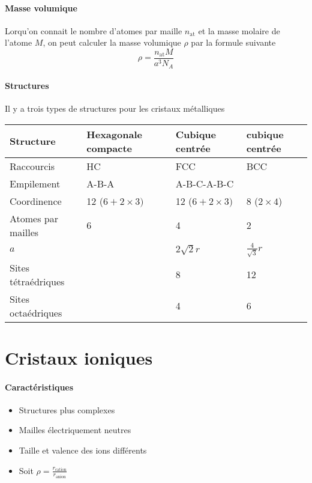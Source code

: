 \paragraph{Masse volumique}
Lorqu'on connait le nombre d'atomes par maille $n_{\mathrm{at}}$ et la masse molaire de l'atome $M$,
on peut calculer la masse volumique $\rho$ par la formule suivante
\[ \rho = \frac{n_{\mathrm{at}}M}{a^3N_A} \]

\paragraph{Structures}
Il y a trois types de structures pour les cristaux métalliques
\begin{center}
	\begin{tabular}{|p{2cm}|l|l|l|}
		\hline
		Structure & Hexagonale compacte & Cubique centrée & cubique centrée\\
		\hline
		Raccourcis & HC & FCC & BCC\\
		\hline
		Empilement & A-B-A & A-B-C-A-B-C\\
		\hline
		Coordinence & 12 ($6 + 2\times3)$ & 12 ($6 + 2\times3)$ & 8 ($2 \times 4$)\\
		\hline
		Atomes par mailles & 6 & 4 & 2\\
		\hline
		$a$ & & $2\sqrt{2}r$ & $\frac{4}{\sqrt{3}}r$\\
		\hline
		Sites tétraédriques & & 8 & 12\\
		\hline
		Sites octaédriques & & 4 & 6\\
		\hline
	\end{tabular}
\end{center}

\section{Cristaux ioniques}

\paragraph{Caractéristiques}
\begin{itemize}
	\item Structures plus complexes
	\item Mailles électriquement neutres
	\item Taille et valence des ions différents
	\item Soit $\rho = \frac{r_\mathrm{cation}}{r_\mathrm{anion}}$
\end{itemize}

